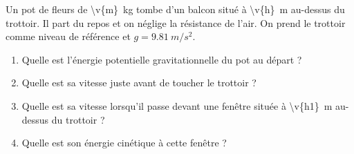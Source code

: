 Un pot de fleurs de \qty{\v{m}}{kg} tombe d'un balcon situé à \qty{\v{h}}{m} au-dessus du trottoir. Il part du repos et on néglige la résistance de l'air. On prend le trottoir comme niveau de référence et $g = \qty{9.81}{m/s^2}$.

\begin{enumerate}[label=\alph*)]
    \item Quelle est l'énergie potentielle gravitationnelle du pot au départ ?
    \item Quelle est sa vitesse juste avant de toucher le trottoir ?
    \item Quelle est sa vitesse lorsqu'il passe devant une fenêtre située à \qty{\v{h1}}{m} au-dessus du trottoir ?
    \item Quelle est son énergie cinétique à cette fenêtre ?
\end{enumerate}
